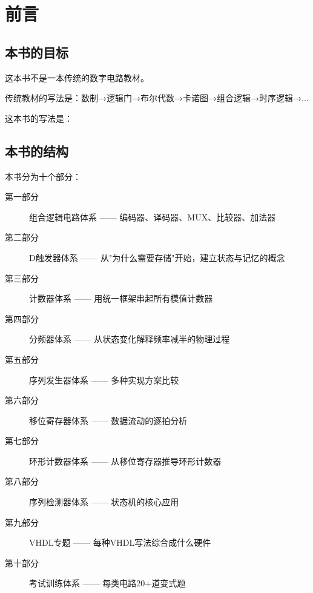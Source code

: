 \chapter*{前言}

\section*{本书的目标}

这本书不是一本传统的数字电路教材。

传统教材的写法是：数制→逻辑门→布尔代数→卡诺图→组合逻辑→时序逻辑→... \par

这本书的写法是：\par
\begin{center}
\end{center}

\section*{本书的结构}

本书分为十个部分：

\begin{description}
  \item[第一部分] 组合逻辑电路体系 —— 编码器、译码器、MUX、比较器、加法器
  \item[第二部分] D触发器体系 —— 从"为什么需要存储"开始，建立状态与记忆的概念
  \item[第三部分] 计数器体系 —— 用统一框架串起所有模值计数器
  \item[第四部分] 分频器体系 —— 从状态变化解释频率减半的物理过程
  \item[第五部分] 序列发生器体系 —— 多种实现方案比较
  \item[第六部分] 移位寄存器体系 —— 数据流动的逐拍分析
  \item[第七部分] 环形计数器体系 —— 从移位寄存器推导环形计数器
  \item[第八部分] 序列检测器体系 —— 状态机的核心应用
  \item[第九部分] VHDL专题 —— 每种VHDL写法综合成什么硬件
  \item[第十部分] 考试训练体系 —— 每类电路20+道变式题
\end{description}

